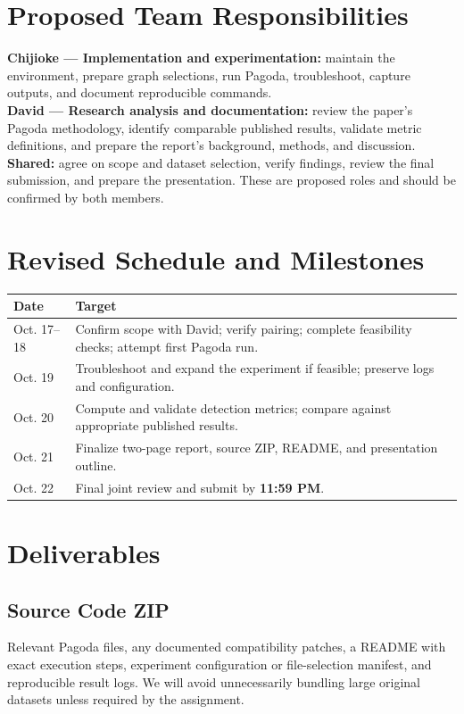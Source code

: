 \documentclass[11pt,letterpaper]{article}
\begin{document}
\section{Proposed Team Responsibilities}
\textbf{Chijioke --- Implementation and experimentation:} maintain the environment, prepare graph selections, run Pagoda, troubleshoot, capture outputs, and document reproducible commands.\\
\textbf{David --- Research analysis and documentation:} review the paper's Pagoda methodology, identify comparable published results, validate metric definitions, and prepare the report's background, methods, and discussion.\\
\textbf{Shared:} agree on scope and dataset selection, verify findings, review the final submission, and prepare the presentation. These are proposed roles and should be confirmed by both members.

\section{Revised Schedule and Milestones}
\begin{tabularx}{\linewidth}{@{}lX@{}}\toprule
\textbf{Date} & \textbf{Target}\\\midrule
Oct. 17--18 & Confirm scope with David; verify pairing; complete feasibility checks; attempt first Pagoda run.\\
Oct. 19 & Troubleshoot and expand the experiment if feasible; preserve logs and configuration.\\
Oct. 20 & Compute and validate detection metrics; compare against appropriate published results.\\
Oct. 21 & Finalize two-page report, source ZIP, README, and presentation outline.\\
Oct. 22 & Final joint review and submit by \textbf{11:59 PM}.\\\bottomrule
\end{tabularx}

\section{Deliverables}
\subsection{Source Code ZIP}
Relevant Pagoda files, any documented compatibility patches, a README with exact execution steps, experiment configuration or file-selection manifest, and reproducible result logs. We will avoid unnecessarily bundling large original datasets unless required by the assignment.
\end{document}
